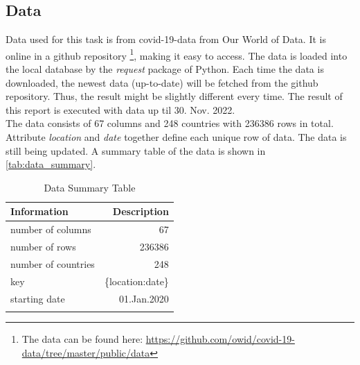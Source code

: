 \documentclass[10pt, a4paper, twocolumn]{article} %
\begin{document}
\subsection{Data}
Data used for this task is from covid-19-data from Our World of Data. It is online in a github repository
\footnote{The data can be found here: \url{https://github.com/owid/covid-19-data/tree/master/public/data}}, making 
it easy to access. The data is loaded into the local database\citep{Thomas} by the \emph{request} package of Python. Each time 
the data is downloaded, the newest data (up-to-date) will be fetched from the github repository. Thus, 
the result might be slightly different every time. The result of this report is executed with data up til 30. Nov. 2022.\\[10pt]
The data consists of 67 columns and 248 countries with 236386 rows in total. Attribute \emph{location} and 
\emph{date} together define each unique row of data. The data is still being updated. 
A summary table of the data is shown 
in \autoref{tab:data_summary}.
\begin{table}
	\caption{Data Summary Table}
	\centering
	\begin{tabular}{lr}
		\toprule
		\textbf{Information} & \textbf{Description} \\
		\midrule
		number of columns & 67 \\
		number of rows & 236386 \\
		number of countries & 248 \\
		key & \{location:date\}\\
		starting date & 01.Jan.2020\\
		\bottomrule
	\label{tab:data_summary}
	\end{tabular}
\end{table}
\end{document}
